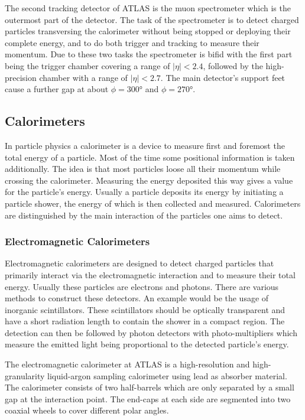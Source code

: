 The second tracking detector of ATLAS is the muon spectrometer which is the outermost part of the detector. The task of the spectrometer is to detect charged particles transversing the calorimeter without being stopped or deploying their complete energy, and to do both trigger and tracking to measure their momentum. Due to these two tasks the spectrometer is bifid with the first part being the trigger chamber covering a range of $|\eta|<2.4$, followed by the high-precision chamber with a range of $|\eta|<2.7$. The main detector's support feet cause a further gap at about $\phi = \ang{300}$ and $\phi = \ang{270}$.


\subsection{Calorimeters}

In particle physics a calorimeter is a device to measure first and foremost the total energy of a particle. Most of the time some positional information is taken  additionally.
The idea is that most particles loose all their momentum while crossing the calorimeter. Measuring the energy deposited this way gives a value for the particle's energy.
Usually a particle deposits its energy by initiating a particle shower, the energy of which is then collected and measured.
Calorimeters are distinguished by the main interaction of the particles one aims to detect. 

\subsubsection{Electromagnetic Calorimeters}

Electromagnetic calorimeters are designed to detect charged particles that primarily interact via the electromagnetic interaction and to measure their total energy. Usually these particles are electrons and photons. There are various methods to construct these detectors. An example would be the usage of inorganic scintillators. These scintillators should be optically transparent and have a short radiation length to contain the shower in a compact region. The detection can then be followed by photon detectors with photo-multipliers which measure the emitted light being proportional to the detected particle's energy.\cite{leo}

The electromagnetic calorimeter at ATLAS is a high-resolution and high-granularity liquid-argon sampling calorimeter using lead as absorber material. The calorimeter consists of two half-barrels which are only separated by a small gap at the interaction point. The end-caps at each side are segmented into two coaxial wheels to cover different polar angles.

